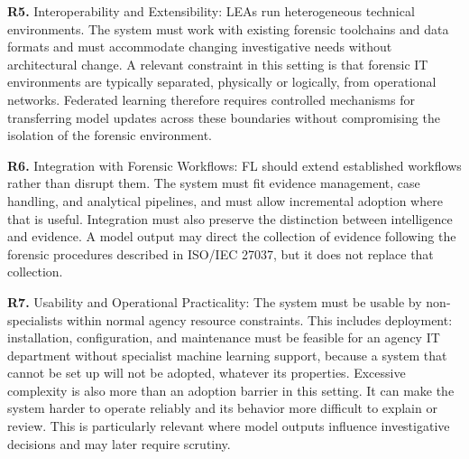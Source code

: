 \textbf{R5.} Interoperability and Extensibility: LEAs run heterogeneous technical environments. The system must work with existing forensic toolchains and data formats and must accommodate changing investigative needs without architectural change. A relevant constraint in this setting is that forensic IT environments are typically separated, physically or logically, from operational networks. Federated learning therefore requires controlled mechanisms for transferring model updates across these boundaries without compromising the isolation of the forensic environment.

\textbf{R6.} Integration with Forensic Workflows:
FL should extend established workflows rather than disrupt them. The system must fit evidence management, case handling, and analytical pipelines, and must allow incremental adoption where that is useful. Integration must also preserve the distinction between intelligence and evidence. A model output may direct the collection of evidence following the forensic procedures described in ISO/IEC 27037, but it does not replace that collection.

\textbf{R7.} Usability and Operational Practicality:
The system must be usable by non-specialists within normal agency resource constraints. This includes deployment: installation, configuration, and maintenance must be feasible for an agency IT department without specialist machine learning support, because a system that cannot be set up will not be adopted, whatever its properties. Excessive complexity is also more than an adoption barrier in this setting. It can make the system harder to operate reliably and its behavior more difficult to explain or review. This is particularly relevant where model outputs influence investigative decisions and may later require scrutiny.

